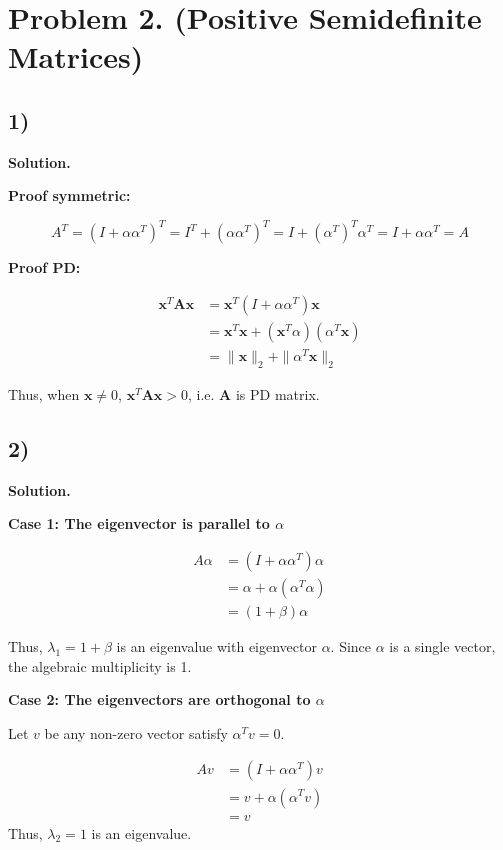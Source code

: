 \documentclass{article}
\newcommand{\x}{{\mathbf{x}}} %
\newcommand{\0}{{\mathbf{0}}} %
\newcommand{\A}{{\mathbf{A}}} %
\begin{document}
\section*{Problem 2. (Positive Semideﬁnite Matrices)}

\subsection*{1)}

\textbf{Solution.}

\textbf{Proof symmetric:}

$$
A^T = (I + \alpha \alpha^T)^T = I^T + (\alpha \alpha^T)^T = I + (\alpha^T)^T \alpha^T = I + \alpha \alpha^T = A
$$

\textbf{Proof PD:}

$$
\begin{aligned}
\x^T \A \x &= \x^T (I + \alpha \alpha^T) \x \\
&= \x^T \x + (\x^T \alpha) (\alpha^T \x)    \\
&= \|\x\|_2 + \|\alpha^T \x\|_2
\end{aligned}$$

Thus, when $\x \ne 0$, $\x^T \A \x > 0$, i.e. $\A$ is PD matrix.

\subsection*{2)}

\textbf{Solution.}

\textbf{Case 1: The eigenvector is parallel to $\alpha$}

$$
\begin{aligned}
A \alpha &= (I + \alpha \alpha^T) \alpha \\
&= \alpha + \alpha (\alpha^T \alpha)    \\
&= (1 + \beta)\alpha
\end{aligned}$$

Thus, $\lambda_1 = 1 + \beta$ is an eigenvalue with eigenvector $\alpha$.
Since $\alpha$ is a single vector, the algebraic multiplicity is 1.

\textbf{Case 2: The eigenvectors are orthogonal to $\alpha$}

Let $v$ be any non-zero vector satisfy $\alpha^T v = 0$.

$$
\begin{aligned}
A v &= (I + \alpha \alpha^T) v \\
&= v + \alpha (\alpha^T v) \\
&= v
\end{aligned}$$
Thus, $\lambda_2 = 1$ is an eigenvalue.
\end{document}
